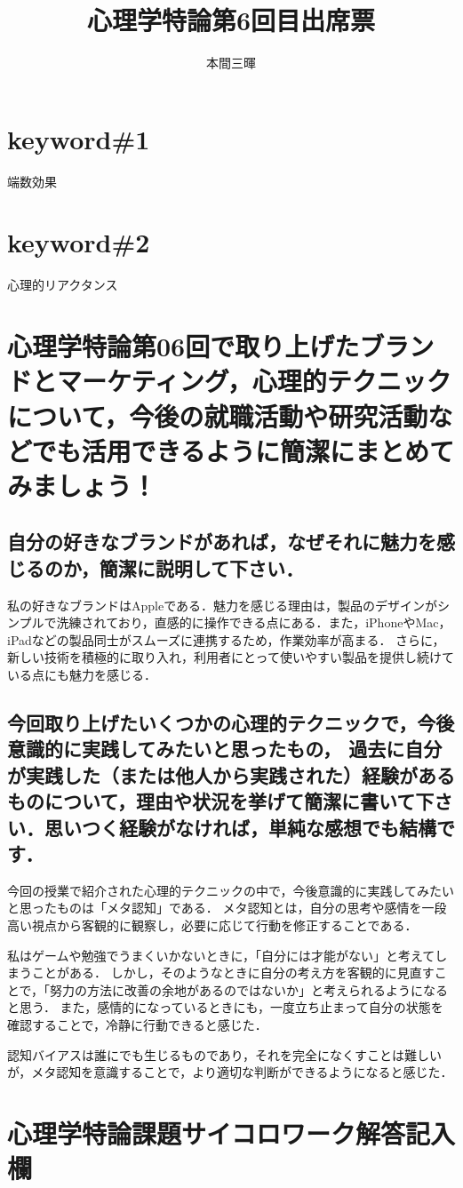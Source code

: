 \documentclass[titlepage,a4paper]{jsarticle}
\title{心理学特論第6回目出席票}
\author{本間三暉}
\begin{document}
\maketitle
\section*{keyword\#1}
端数効果
\section*{keyword\#2}
心理的リアクタンス
\section{心理学特論第06回で取り上げたブランドとマーケティング，心理的テクニックについて，今後の就職活動や研究活動などでも活用できるように簡潔にまとめてみましょう！}

\subsection{自分の好きなブランドがあれば，なぜそれに魅力を感じるのか，簡潔に説明して下さい．}
私の好きなブランドはAppleである．魅力を感じる理由は，製品のデザインがシンプルで洗練されており，直感的に操作できる点にある．また，iPhoneやMac，iPadなどの製品同士がスムーズに連携するため，作業効率が高まる．
さらに，新しい技術を積極的に取り入れ，利用者にとって使いやすい製品を提供し続けている点にも魅力を感じる．
\subsection{今回取り上げたいくつかの心理的テクニックで，今後意識的に実践してみたいと思ったもの，
過去に自分が実践した（または他人から実践された）経験があるものについて，理由や状況を挙げて簡潔に書いて下さい．思いつく経験がなければ，単純な感想でも結構です．}
今回の授業で紹介された心理的テクニックの中で，今後意識的に実践してみたいと思ったものは「メタ認知」である．
メタ認知とは，自分の思考や感情を一段高い視点から客観的に観察し，必要に応じて行動を修正することである．

私はゲームや勉強でうまくいかないときに，「自分には才能がない」と考えてしまうことがある．
しかし，そのようなときに自分の考え方を客観的に見直すことで，「努力の方法に改善の余地があるのではないか」と考えられるようになると思う．
また，感情的になっているときにも，一度立ち止まって自分の状態を確認することで，冷静に行動できると感じた．

認知バイアスは誰にでも生じるものであり，それを完全になくすことは難しいが，メタ認知を意識することで，より適切な判断ができるようになると感じた．
\newpage
\section{心理学特論課題サイコロワーク解答記入欄}
\end{document}
